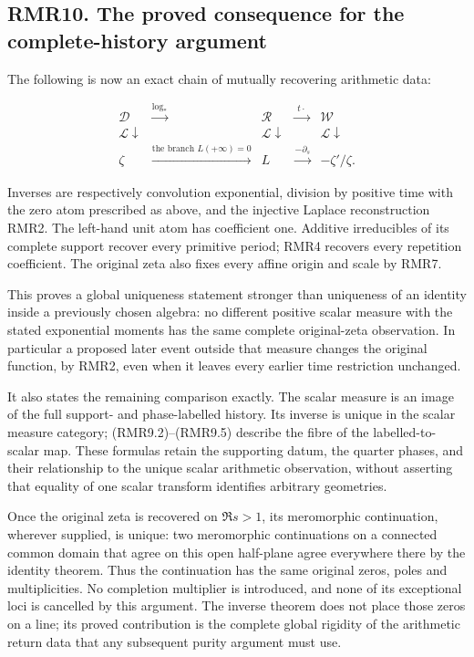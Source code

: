 \documentclass[
]{article}
\newcounter{none} %
\begin{document}
\subsection{RMR10. The proved consequence for the complete-history
argument}\label{rmr10.-the-proved-consequence-for-the-complete-history-argument}

The following is now an exact chain of mutually recovering arithmetic
data:

\[
\begin{array}{ccccc}
\mathcal D&\xrightarrow{\log_*}&\mathcal R&\xrightarrow{\;t\cdot\;}&\mathcal W\\
\mathcal L\downarrow&&\mathcal L\downarrow&&\mathcal L\downarrow\\
\zeta&\xrightarrow{\text{the branch }L(+\infty)=0}&L
&\xrightarrow{-\partial_s}&-\zeta'/\zeta.
\end{array}
\tag{RMR10.1}
\]

Inverses are respectively convolution exponential, division by positive
time with the zero atom prescribed as above, and the injective Laplace
reconstruction RMR2. The left-hand unit atom has coefficient one.
Additive irreducibles of its complete support recover every primitive
period; RMR4 recovers every repetition coefficient. The original zeta
also fixes every affine origin and scale by RMR7.

This proves a global uniqueness statement stronger than uniqueness of an
identity inside a previously chosen algebra: no different positive
scalar measure with the stated exponential moments has the same complete
original-zeta observation. In particular a proposed later event outside
that measure changes the original function, by RMR2, even when it leaves
every earlier time restriction unchanged.

It also states the remaining comparison exactly. The scalar measure is
an image of the full support- and phase-labelled history. Its inverse is
unique in the scalar measure category; (RMR9.2)--(RMR9.5) describe the
fibre of the labelled-to-scalar map. These formulas retain the
supporting datum, the quarter phases, and their relationship to the
unique scalar arithmetic observation, without asserting that equality of
one scalar transform identifies arbitrary geometries.

Once the original zeta is recovered on \(\Re s>1\), its meromorphic
continuation, wherever supplied, is unique: two meromorphic
continuations on a connected common domain that agree on this open
half-plane agree everywhere there by the identity theorem. Thus the
continuation has the same original zeros, poles and multiplicities. No
completion multiplier is introduced, and none of its exceptional loci is
cancelled by this argument. The inverse theorem does not place those
zeros on a line; its proved contribution is the complete global rigidity
of the arithmetic return data that any subsequent purity argument must
use.
\end{document}
